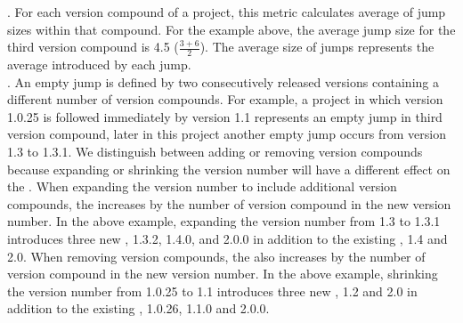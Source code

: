 \documentclass[conference]{IEEEtran}
\begin{document}
  
. For each version compound of a project, this metric calculates average of  jump sizes within that compound. 
For the example above, the average jump size for the third version compound is 4.5 ($\frac{ 3 + 6 }{2}$).
The average size of jumps represents the average \numberchoices introduced by each jump. 
\\
 

 



. An empty jump is defined by two consecutively released versions containing a different number of version compounds. 
For example, a project in which version 1.0.25 is followed immediately by version 1.1 represents an empty jump in third version compound, later in this project another empty jump occurs from version 1.3 to 1.3.1. 
We distinguish between adding or removing version compounds because expanding or shrinking the version number will have a different effect on the \numberchoices. 
When expanding the version number to include additional version compounds, the \numberchoices increases by the number of version compound in the new version number. In the above example, expanding the version number from 1.3 to 1.3.1 introduces three new \choices, 1.3.2, 1.4.0, and 2.0.0 in addition to the existing \choices, 1.4 and 2.0. 
When removing version compounds, the \numberchoices also increases by the number of version compound in the new version number. In the above example, shrinking the version number from 1.0.25 to 1.1 introduces three new \choices, 1.2 and 2.0 in addition to the existing \choices, 1.0.26, 1.1.0 and 2.0.0. \\
\end{document}
